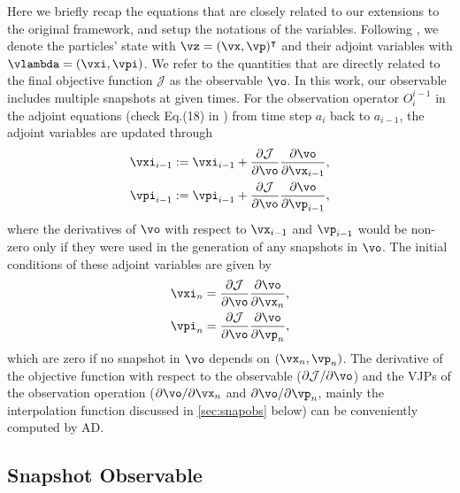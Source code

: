 \documentclass[modern, trackchanges, dvipsnames]{aastex631}
\newcommand{\p}{\partial}
\newcommand{\cJ}{\mathcal{J}}
\begin{document}
Here we briefly recap the equations that are closely related to our
extensions to the original framework, and setup the notations of the variables.
Following \cite{Li2022a}, we denote the particles' state with $\vz = (\vx,
\vp)^\intercal$ and their adjoint variables with $\vlambda = (\vxi, \vpi)$.
We refer to the quantities that are directly related to the final objective
function $\cJ$ as the observable $\vo$.
In this work, our observable includes multiple snapshots at given times.
For the observation operator $O_{i}^{i-1}$ in the adjoint equations (check
Eq.(18) in \cite{Li2022a}) from time step $a_i$ back to $a_{i-1}$, the adjoint
variables are updated through
\begin{align}
  \vxi_{i-1} &:= \vxi_{i-1} + \frac{\p\cJ}{\p\vo}\frac{\p\vo}{\p \vx_{i-1}}, \nonumber\\
  \vpi_{i-1} &:= \vpi_{i-1} + \frac{\p\cJ}{\p\vo}\frac{\p\vo}{\p \vp_{i-1}},
\end{align}
where the derivatives of $\vo$ with respect to $\vx_{i-1}$ and $\vp_{i-1}$ would
be non-zero only if they were used in the generation of any snapshots in $\vo$.
The initial conditions of these adjoint variables are given by
\begin{align}
  \vxi_n &= \frac{\p\cJ}{\p\vo}\frac{\p\vo}{\p\vx_n}, \nonumber\\
  \vpi_n &= \frac{\p\cJ}{\p\vo}\frac{\p\vo}{\p\vp_n},
\end{align}
which are zero if no snapshot in $\vo$ depends on $(\vx_n, \vp_n)$.
The derivative of the objective function with respect to the observable
($\p\cJ/\p\vo$) and the VJPs of the observation operation ($\p\vo/\p\vx_n$ and
$\p\vo/\p\vp_n$, mainly the interpolation function discussed in
\autoref{sec:snapobs} below) can be conveniently computed by AD.


\vspace{1em}
\subsection{Snapshot Observable}
\label{sec:snapobs}
\end{document}
